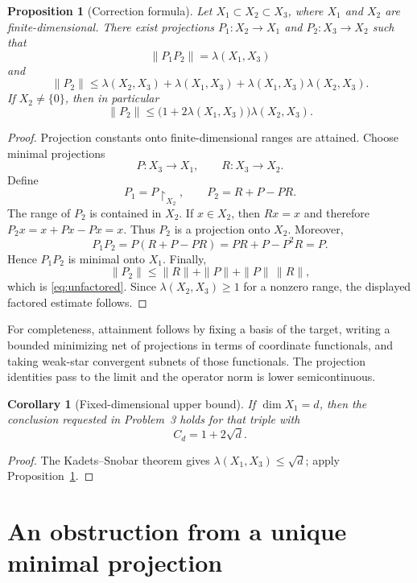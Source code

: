 \documentclass[11pt]{article}
\newtheorem{proposition}[theorem]{Proposition}
\newtheorem{corollary}[theorem]{Corollary}
\theoremstyle{remark}
\newcommand{\restr}[2]{#1\!\restriction_{#2}}
\begin{document}
\begin{proposition}[Correction formula]\label{prop:correction}
Let $X_1\subset X_2\subset X_3$, where $X_1$ and $X_2$ are
finite-dimensional.  There exist projections $P_1:X_2\to X_1$ and
$P_2:X_3\to X_2$ such that
\[
 \|P_1P_2\|=\lambda(X_1,X_3)
\]
and
\begin{equation}\label{eq:unfactored}
 \|P_2\|\leq \lambda(X_2,X_3)+\lambda(X_1,X_3)
       +\lambda(X_1,X_3)\lambda(X_2,X_3).
\end{equation}
If $X_2\neq\{0\}$, then in particular
\[
 \|P_2\|\leq
 \bigl(1+2\lambda(X_1,X_3)\bigr)\lambda(X_2,X_3).
\]
\end{proposition}

\begin{proof}
Projection constants onto finite-dimensional ranges are attained.  Choose
minimal projections
\[
 P:X_3\to X_1,\qquad R:X_3\to X_2.
\]
Define
\[
 P_1=\restr{P}{X_2},\qquad P_2=R+P-PR.
\]
The range of $P_2$ is contained in $X_2$.  If $x\in X_2$, then $Rx=x$ and
therefore $P_2x=x+Px-Px=x$.  Thus $P_2$ is a projection onto $X_2$.
Moreover,
\[
 P_1P_2=P(R+P-PR)=PR+P-P^2R=P.
\]
Hence $P_1P_2$ is minimal onto $X_1$.  Finally,
\[
 \|P_2\|\leq \|R\|+\|P\|+\|P\|\,\|R\|,
\]
which is \eqref{eq:unfactored}.  Since $\lambda(X_2,X_3)\geq 1$ for a
nonzero range, the displayed factored estimate follows.
\end{proof}

For completeness, attainment follows by fixing a basis of the target, writing
a bounded minimizing net of projections in terms of coordinate functionals,
and taking weak-star convergent subnets of those functionals.  The projection
identities pass to the limit and the operator norm is lower semicontinuous.

\begin{corollary}[Fixed-dimensional upper bound]\label{cor:upper}
If $\dim X_1=d$, then the conclusion requested in Problem~3 holds for that
triple with
\[
        C_d=1+2\sqrt d.
\]
\end{corollary}

\begin{proof}
The Kadets--Snobar theorem \cite{KadetsSnobar} gives $\lambda(X_1,X_3)\leq\sqrt d$; apply
Proposition~\ref{prop:correction}.
\end{proof}

\section{An obstruction from a unique minimal projection}
\label{sec:obstruction}
\end{document}
